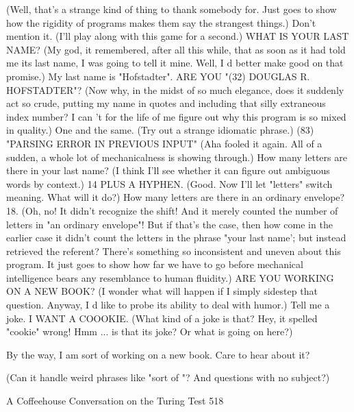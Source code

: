 (Well, that's a strange kind of thing to thank somebody for. Just goes to show how the
rigidity of programs makes them say the strangest things.)
Don't mention it.
(I'll play along with this game for a second.)
WHAT IS YOUR LAST NAME?
(My god, it remembered, after all this while, that as soon as it had told me its last
name, I was going to tell it mine. Well, I d better make good on that promise.)
My last name is "Hofstadter".
ARE YOU "(32) DOUGLAS R. HOFSTADTER"?
(Now why, in the midst of so much elegance, does it suddenly act so crude, putting my
name in quotes and including that silly extraneous index number? I can 't for the life
of me figure out why this program is so mixed in quality.)
One and the same.
(Try out a strange idiomatic phrase.)
(83) "PARSING ERROR IN PREVIOUS INPUT"
(Aha fooled it again. All of a sudden, a whole lot of mechanicalness is showing
through.)
How many letters are there in your last name?
(I think I'll see whether it can figure out ambiguous words by context.)
14 PLUS A HYPHEN.
(Good. Now I'll let "letters" switch meaning. What will it do?)
How many letters are there in an ordinary envelope?
18.
(Oh, no! It didn't recognize the shift! And it merely counted the number of letters in
"an ordinary envelope"! But if that's the case, then how come in the earlier case it
didn't count the letters in the phrase "your last name'; but instead retrieved the
referent? There's something so inconsistent and uneven about this program. It just
goes to show how far we have to go before mechanical intelligence bears any
resemblance to human fluidity.)
ARE YOU WORKING ON A NEW BOOK?
(I wonder what will happen if I simply sidestep that question. Anyway, I d like to
probe its ability to deal with humor.)
Tell me a joke.
I WANT A COOOKIE.
(What kind of a joke is that? Hey, it spelled "cookie" wrong! Hmm ... is that its joke?
Or what is going on here?)

By the way, I am sort of working on a new book. Care to hear about it?

(Can it handle weird phrases like "sort of "? And questions with no subject?)




A Coffeehouse Conversation on the Turing Test                                      518

